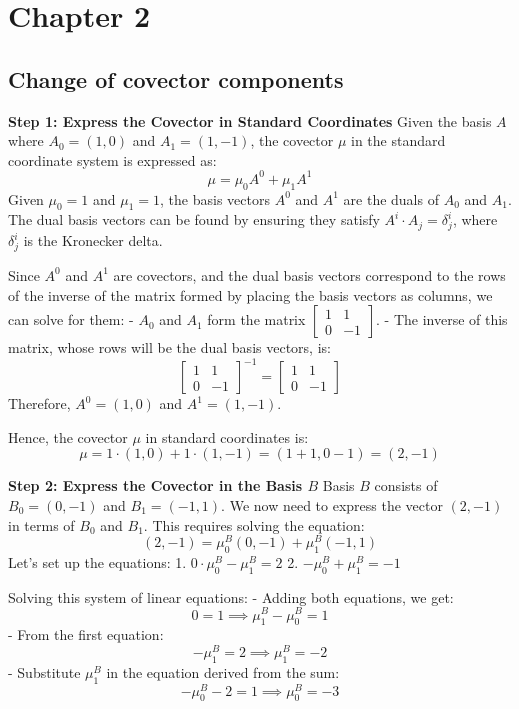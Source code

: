 \documentclass{article}
\begin{document}
\newpage
\section{Chapter 2}
\subsection{Change of covector components}

\textbf{Step 1: Express the Covector in Standard Coordinates}
Given the basis \(A\) where \(A_0 = (1,0)\) and \(A_1 = (1,-1)\), the covector \(\mu\) in the standard coordinate system is expressed as:
\[
\mu = \mu_0 A^0 + \mu_1 A^1
\]
Given \(\mu_0 = 1\) and \(\mu_1 = 1\), the basis vectors \(A^0\) and \(A^1\) are the duals of \(A_0\) and \(A_1\). The dual basis vectors can be found by ensuring they satisfy \(A^i \cdot A_j = \delta^i_j\), where \(\delta^i_j\) is the Kronecker delta.

Since \(A^0\) and \(A^1\) are covectors, and the dual basis vectors correspond to the rows of the inverse of the matrix formed by placing the basis vectors as columns, we can solve for them:
- \(A_0\) and \(A_1\) form the matrix \(\begin{bmatrix} 1 & 1 \\ 0 & -1 \end{bmatrix}\).
- The inverse of this matrix, whose rows will be the dual basis vectors, is:
  \[
  \begin{bmatrix} 1 & 1 \\ 0 & -1 \end{bmatrix}^{-1} = \begin{bmatrix} 1 & 1 \\ 0 & -1 \end{bmatrix}
  \]
  Therefore, \(A^0 = (1, 0)\) and \(A^1 = (1, -1)\).

Hence, the covector \(\mu\) in standard coordinates is:
\[
\mu = 1 \cdot (1, 0) + 1 \cdot (1, -1) = (1+1, 0-1) = (2, -1)
\]

\textbf{Step 2: Express the Covector in the Basis \(B\)}
Basis \(B\) consists of \(B_0 = (0, -1)\) and \(B_1 = (-1, 1)\). We now need to express the vector \((2, -1)\) in terms of \(B_0\) and \(B_1\). This requires solving the equation:
\[
(2, -1) = \mu^B_0 (0, -1) + \mu^B_1 (-1, 1)
\]
Let's set up the equations:
1. \(0 \cdot \mu^B_0 - \mu^B_1 = 2\)
2. \(-\mu^B_0 + \mu^B_1 = -1\)

Solving this system of linear equations:
- Adding both equations, we get:
  \[
  0 = 1 \implies \mu^B_1 - \mu^B_0 = 1
  \]
- From the first equation:
  \[
  -\mu^B_1 = 2 \implies \mu^B_1 = -2
  \]
- Substitute \(\mu^B_1\) in the equation derived from the sum:
  \[
  -\mu^B_0 - 2 = 1 \implies \mu^B_0 = -3
  \]
\end{document}
